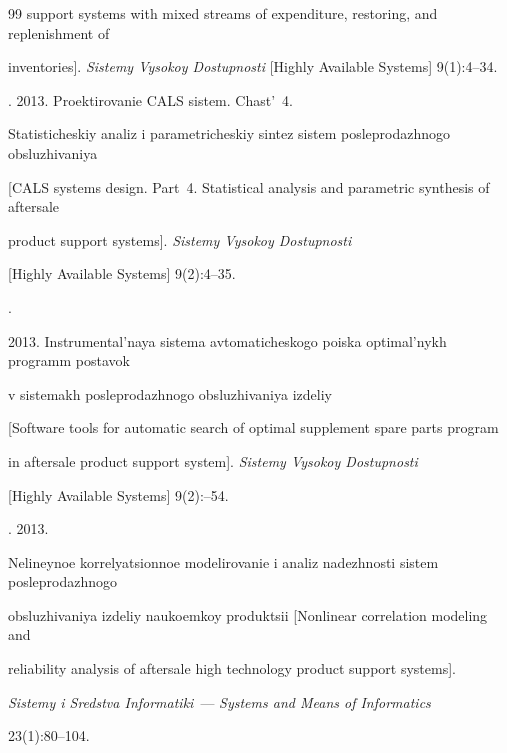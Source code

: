 {{\begin{thebibliography}{99}
support systems with mixed streams of expenditure, restoring, and replenishment of

inventories]. \textit{Sistemy Vysokoy Dostupnosti} [{Highly Available Systems}] 9(1):4--34.


. 2013. Proektirovanie CALS sistem. Chast'~4.

Statisticheskiy analiz i parametricheskiy sintez sistem posleprodazhnogo obsluzhivaniya

[CALS systems design. Part~4. Statistical analysis and parametric synthesis of aftersale

product support systems]. \textit{Sistemy Vysokoy Dostupnosti}

[{Highly Available Systems}] 9(2):4--35.


.

 2013. Instrumental'naya sistema avtomaticheskogo poiska optimal'nykh programm postavok

 v sistemakh posleprodazhnogo obsluzhivaniya izdeliy

 [Software tools for automatic search of optimal supplement spare parts program

 in aftersale product support system]. \textit{Sistemy Vysokoy Dostupnosti}

 [{Highly Available Systems}] 9(2):--54.

 { %



 }


. 2013.

Nelineynoe korrelyatsionnoe modelirovanie i analiz nadezhnosti sistem posleprodazhnogo

obsluzhivaniya izdeliy naukoemkoy produktsii [Nonlinear correlation modeling and

reliability analysis of aftersale high technology product support systems].

\textit{Sistemy i Sredstva Informatiki}~--- \textit{Systems and Means of Informatics}

23(1):80--104.



\end{thebibliography}}}
